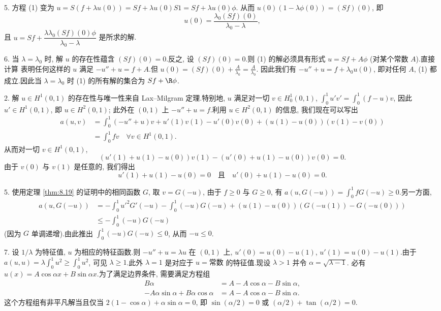 5. 方程 (1) 变为 $u=S(f+\lambda u(0))=Sf+\lambda u(0)S1=Sf+\lambda u(0)\phi$.
从而 $u(0)(1-\lambda\phi(0))=(Sf)(0)$, 即
\begin{equation*}
u(0)=\frac{\lambda_0(Sf)(0)}{\lambda_0-\lambda},
\end{equation*}
且 $u=Sf+\dfrac{\lambda\lambda_0(Sf)(0)\phi}{\lambda_0-\lambda}$ 是所求的解.

6. 当 $\lambda=\lambda_0$ 时, 解 $u$ 的存在性蕴含 $(Sf)(0)=0$.反之, 设
$(Sf)(0)=0$.则 (1) 的解必须具有形式 $u=Sf+A\phi$ (对某个常数 $A$).直接计算
表明任何这样的 $u$ 满足 $-u''+u=f+A$.但 $u(0)=(Sf)(0)+\frac{A}{\lambda_0}=\frac{A}{\lambda_0}$.
因此我们有 $-u''+u=f+\lambda_0u(0)$, 即对任何 $A$, (1) 都成立.因此当
$\lambda=\lambda_0$ 时 (1) 的所有解的集合为 $Sf+\R\phi$.


2. 解 $u\in H^1(0,1)$ 的存在性与唯一性来自 Lax--Milgram 定理.特别地, $u$
满足对一切 $v\in H_0^1(0,1)$, $\int_0^1u'v'=\int_0^1(f-u)v$, 因此
$u'\in H^1(0,1)$, 即 $u\in H^2(0,1)$; 此外在 $(0,1)$ 上 $-u''+u=f$.利用
$u\in H^2(0,1)$ 的信息, 我们现在可以写出
\begin{align*}
a(u,v)&=\int_0^1(-u''+u)v+u'(1)v(1)-u'(0)v(0)+(u(1)-u(0))(v(1)-v(0))\\
&=\int_0^1fv\quad\forall v\in H^1(0,1).
\end{align*}
从而对一切 $v\in H^1(0,1)$,
\begin{equation*}
(u'(1)+u(1)-u(0))v(1)-(u'(0)+u(1)-u(0))v(0)=0.
\end{equation*}
由于 $v(0)$ 与 $v(1)$ 是任意的, 我们得出
\begin{equation*}
u'(1)+u(1)-u(0)=0\quad\text{且}\quad u'(0)+u(1)-u(0)=0.
\end{equation*}

5. 使用定理  \ref{thm:8.19} 的证明中的相同函数 $G$, 取 $v=G(-u)$, 由于
$f\ge0$ 与 $G\ge0$, 有 $a(u,G(-u))=\int_0^1fG(-u)\ge0$.另一方面,
\begin{align*}
a(u,G(-u))&=-\int_0^1u'^2G'(-u)-\int_0^1(-u)G(-u)+(u(1)-u(0))(G(-u(1))-G(-u(0)))\\
&\le-\int_0^1(-u)G(-u)
\end{align*}
(因为 $G$ 单调递增).由此推出 $\int_0^1(-u)G(-u)\le0$, 从而 $-u\le0$.

7. 设 $1/\lambda$ 为特征值, $u$ 为相应的特征函数.则 $-u''+u=\lambda u$ 在
$(0,1)$ 上, $u'(0)=u(0)-u(1)$, $u'(1)=u(0)-u(1)$.由于
$a(u,u)=\lambda\int_0^1u^2\ge\int_0^1u^2$, 可见 $\lambda\ge1$.此外 $\lambda=1$
是对应于 $u=\text{常数}$ 的特征值.现设 $\lambda>1$ 并令 $\alpha=\sqrt{\lambda-1}$.
必有 $u(x)=A\cos\alpha x+B\sin\alpha x$.为了满足边界条件, 需要满足方程组
\begin{align*}
B\alpha&=A-A\cos\alpha-B\sin\alpha,\\
-A\alpha\sin\alpha+B\alpha\cos\alpha&=A-A\cos\alpha-B\sin\alpha.
\end{align*}
这个方程组有非平凡解当且仅当 $2(1-\cos\alpha)+\alpha\sin\alpha=0$, 即
$\sin(\alpha/2)=0$ 或 $(\alpha/2)+\tan(\alpha/2)=0$.

